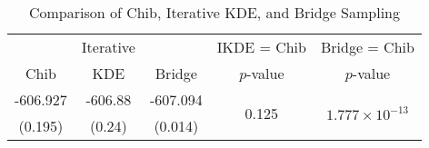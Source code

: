 \begin{table*}
\centering
\begin{tabular}{c|c|c|c|c}
   & Iterative &  & IKDE = Chib & Bridge = Chib \\ 
  Chib & KDE & Bridge & $p$-value & $p$-value \\ 
   \hline
\hline
-606.927 & -606.88 & -607.094 & \multirow{2}{*}{0.125} & \multirow{2}{*}{$1.777\times 10^{-13}$} \\ 
  (0.195) & (0.24) & (0.014) &  &  \\ 
   \hline
\end{tabular}
\caption{Comparison of Chib, Iterative KDE, and Bridge Sampling} 
\label{tab:bridge}
\end{table*}
